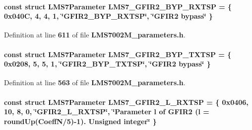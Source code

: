 \paragraph[{L\+M\+S7\+\_\+\+G\+F\+I\+R2\+\_\+\+B\+Y\+P\+\_\+\+R\+X\+T\+SP}]{\setlength{\rightskip}{0pt plus 5cm}const struct {\bf L\+M\+S7\+Parameter} L\+M\+S7\+\_\+\+G\+F\+I\+R2\+\_\+\+B\+Y\+P\+\_\+\+R\+X\+T\+SP = \{ 0x040\+C, 4, 4, 1, \char`\"{}\+G\+F\+I\+R2\+\_\+\+B\+Y\+P\+\_\+\+R\+X\+T\+S\+P\char`\"{}, \char`\"{}\+G\+F\+I\+R2 bypass\char`\"{} \}\hspace{0.3cm}{\ttfamily [static]}}\label{LMS7002M__parameters_8h_a0ec99992a3d8ed69839c1ad6e874c175}


Definition at line {\bf 611} of file {\bf L\+M\+S7002\+M\+\_\+parameters.\+h}.

\paragraph[{L\+M\+S7\+\_\+\+G\+F\+I\+R2\+\_\+\+B\+Y\+P\+\_\+\+T\+X\+T\+SP}]{\setlength{\rightskip}{0pt plus 5cm}const struct {\bf L\+M\+S7\+Parameter} L\+M\+S7\+\_\+\+G\+F\+I\+R2\+\_\+\+B\+Y\+P\+\_\+\+T\+X\+T\+SP = \{ 0x0208, 5, 5, 1, \char`\"{}\+G\+F\+I\+R2\+\_\+\+B\+Y\+P\+\_\+\+T\+X\+T\+S\+P\char`\"{}, \char`\"{}\+G\+F\+I\+R2 bypass\char`\"{} \}\hspace{0.3cm}{\ttfamily [static]}}\label{LMS7002M__parameters_8h_a8b69b487111115177e4efcffc61b97df}


Definition at line {\bf 563} of file {\bf L\+M\+S7002\+M\+\_\+parameters.\+h}.

\paragraph[{L\+M\+S7\+\_\+\+G\+F\+I\+R2\+\_\+\+L\+\_\+\+R\+X\+T\+SP}]{\setlength{\rightskip}{0pt plus 5cm}const struct {\bf L\+M\+S7\+Parameter} L\+M\+S7\+\_\+\+G\+F\+I\+R2\+\_\+\+L\+\_\+\+R\+X\+T\+SP = \{ 0x0406, 10, 8, 0, \char`\"{}\+G\+F\+I\+R2\+\_\+\+L\+\_\+\+R\+X\+T\+S\+P\char`\"{}, \char`\"{}\+Parameter l of G\+F\+I\+R2 (l = round\+Up(\+Coeff\+N/5)-\/1). Unsigned integer\char`\"{} \}\hspace{0.3cm}{\ttfamily [static]}}\label{LMS7002M__parameters_8h_adca915c8e038d4062361eb47a1afb59a}


